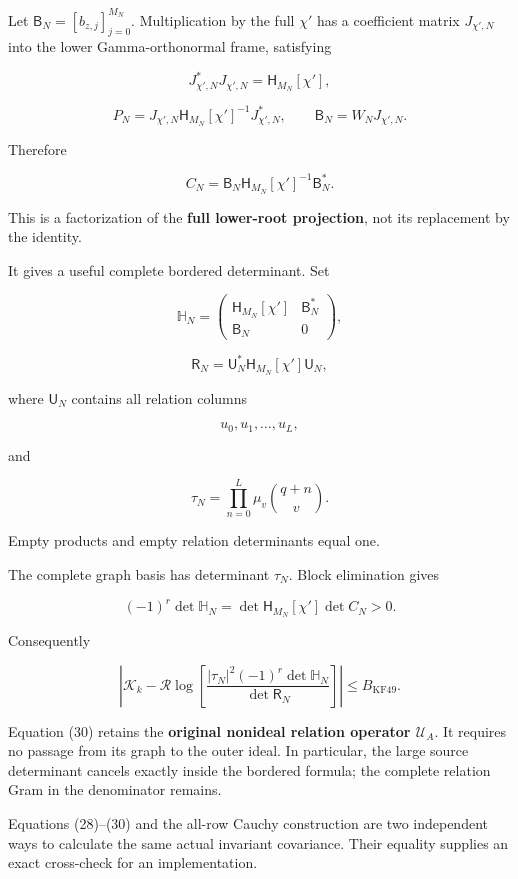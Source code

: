 \documentclass[11pt]{article}
\begin{document}
Let \(\mathsf B_N=[b_{z,j}]_{j=0}^{M_N}\). Multiplication by the full \(\chi'\) has a coefficient matrix \(J_{\chi',N}\) into the lower Gamma-orthonormal frame, satisfying

\[
J_{\chi',N}^*J_{\chi',N}
=\mathsf H_{M_N}[\chi'],
\]

\[
P_N
=
J_{\chi',N}
\mathsf H_{M_N}[\chi']^{-1}
J_{\chi',N}^*,
\qquad
\mathsf B_N=W_NJ_{\chi',N}.
\]

Therefore

\[
\boxed{
C_N
=
\mathsf B_N\mathsf H_{M_N}[\chi']^{-1}\mathsf B_N^*.
}
\tag{29}
\]

This is a factorization of the \textbf{full lower-root projection}, not its replacement by the identity.

It gives a useful complete bordered determinant. Set

\[
\mathbb H_N=
\begin{pmatrix}
\mathsf H_{M_N}[\chi']&\mathsf B_N^*\\
\mathsf B_N&0
\end{pmatrix},
\]

\[
\mathsf R_N
=
\mathsf U_N^*
\mathsf H_{M_N}[\chi']
\mathsf U_N,
\]

where \(\mathsf U_N\) contains all relation columns

\[
u_0,u_1,\ldots,u_L,
\]

and

\[
\tau_N=\prod_{n=0}^{L}\mu_v\binom{q+n}{v}.
\]

Empty products and empty relation determinants equal one.

The complete graph basis has determinant \(\tau_N\). Block elimination gives

\[
(-1)^r\det\mathbb H_N
=
\det\mathsf H_{M_N}[\chi']\det C_N>0.
\]

Consequently

\[
\boxed{
\left|
\mathcal K_k
-
\mathcal R\log
\left[
\frac{
|\tau_N|^2(-1)^r\det\mathbb H_N
}{
\det\mathsf R_N
}
\right]
\right|
\le B_{\mathrm{KF49}}.
}
\tag{30}
\]

Equation (30) retains the \textbf{original nonideal relation operator \(\mathcal U_A\)}. It requires no passage from its graph to the outer ideal. In particular, the large source determinant cancels exactly inside the bordered formula; the complete relation Gram in the denominator remains.

Equations (28)--(30) and the all-row Cauchy construction are two independent ways to calculate the same actual invariant covariance. Their equality supplies an exact cross-check for an implementation.
\end{document}
